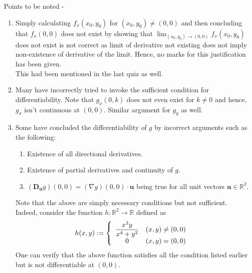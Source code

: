 \documentclass{article}
\begin{document}
Points to be noted -
\begin{enumerate} 
	\item Simply calculating $f_x(x_0, y_0)$ for $(x_0, y_0) \neq (0, 0)$ and then concluding that $f_x(0, 0)$ does not exist by showing that $\displaystyle\lim_{(x_0, y_0)\to (0, 0)}f_x(x_0, y_0)$ does not exist is not correct as limit of derivative not existing does not imply non-existence of derivative of the limit. Hence, no marks for this justification has been given.\\
	This had been mentioned in the last quiz as well.
	\item Many have incorrectly tried to invoke the sufficient condition for differentiability. Note that $g_x(0, k)$ does not even exist for $k \neq 0$ and hence, $g_x$ isn't continuous at $(0, 0).$ Similar argument for $g_y$ as well.
	\item Some have concluded the differentiability of $g$ by incorrect arguments such as the following:
	\begin{enumerate}[nosep] 
		\item Existence of all directional derivatives.
		\item Existence of partial derivatives and continuity of $g.$
		\item $(\mathbf{D_u}g)(0, 0) = (\nabla g)(0, 0)\cdot \mathbf{u}$ being true for all unit vectors $\mathbf{u}\in\mathbb{R}^2.$
	\end{enumerate}
	Note that the above are simply necessary conditions but not sufficient. Indeed, consider the function $h:\mathbb{R}^2 \to \mathbb{R}$ defined as
	\[h(x, y) := \left\{
	\begin{array}{c c}
		\dfrac{x^3y}{x^4 + y^2} & (x, y) \neq (0, 0)\\
		0 & (x, y) = (0, 0)	
	\end{array}
	\right.\]
	One can verify that the above function satisfies all the condition listed earlier but is not differentiable at $(0, 0).$
\end{enumerate}
\end{document}
